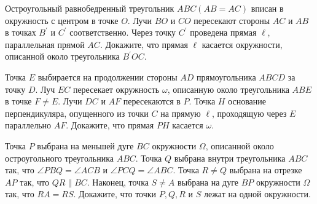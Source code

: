  Остроугольный равнобедренный треугольник $A B C(A B=A C)$ вписан в окружность с центром в точке $O$. Лучи $B O$ и $C O$ пересекают стороны $A C$ и $A B$ в точках $B^{\prime}$ и $C^{\prime}$ соответственно. Через точку $C^{\prime}$ проведена прямая $\ell$, параллельная прямой $A C$. Докажите, что прямая $\ell$ касается окружности, описанной около треугольника $B^{\prime} O C$.

Точка $E$ выбирается на продолжении стороны $A D$ прямоугольника $A B C D$ за точку $D$. Луч $E C$ пересекает окружность $\omega$, описанную около треугольника $A B E$ в точке $F \neq E$. Лучи $D C$ и $A F$ пересекаются в $P$. Точка $H$ основание перпендикуляра, опущенного из точки $C$ на прямую $\ell$, проходящую через $E$ параллельно $A F$. Докажите, что прямая $P H$ касается $\omega$.

Точка $P$ выбрана на меньшей дуге $B C$ окружности $\Omega$, описанной около остроугольного треугольника $A B C$. Точка $Q$ выбрана внутри треугольника $A B C$ так, что $\angle P B Q=\angle A C B$ и $\angle P C Q=\angle A B C$. Точка $R \neq Q$ выбрана на отрезке $A P$ так, что $Q R \| B C$. Наконец, точка $S \neq A$ выбрана на дуге $B P$ окружности $\Omega$ так, что $R A=R S$. Докажите, что точки $P, Q, R$ и $S$ лежат на одной окружности.